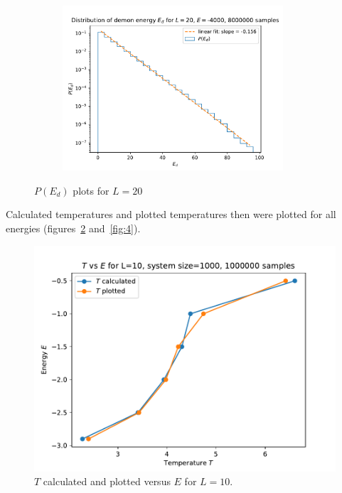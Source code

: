 \documentclass[11pt,a4paper]{article}
\begin{document}
\begin{figure}[b]
\begin{subfigure}{.5\textwidth}
		\end{subfigure}%
		\begin{subfigure}{.5\textwidth}
			\centering
			\includegraphics[width=0.9\textwidth]{E_d_L20_E4000.pdf}
		\end{subfigure}
		\caption[short]{$P(E_d)$ plots for $L=20$}
		\label{fig:2}
		\end{figure}
	
Calculated temperatures and plotted temperatures then were plotted for all energies (figures~\ref{fig:3} and~\ref{fig:4}).

\begin{figure}
\includegraphics{T_vs_E_L10.pdf}
\caption{$T$ calculated and plotted versus $E$ for $L=10$.}
\label{fig:3}
\end{figure}
\end{document}
